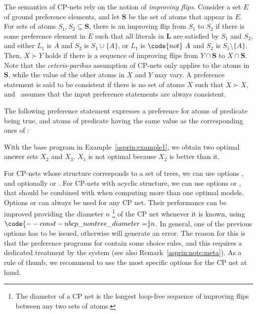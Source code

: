 The semantics of CP-nets rely on the notion of \emph{improving flips}.
%
Consider a set $E$ of ground preference elements,
and let $\boldsymbol{S}$ be the set of atoms that appear in $E$.
%
For sets of atoms $S_1, S_2 \subseteq \boldsymbol{S}$,
there is an improving flip from $S_1$ to $S_2$
if there is some preference element in $E$ such that
all literals in $\boldsymbol{L}$ are satisfied by $S_1$ and $S_2$, and
either $L_1$ is $A$ and $S_2$ is $S_1\cup\{A\}$, or
$L_1$ is $\code{not}~A$ and $S_2$ is $S_1\setminus\{A\}$.
%
Then, $X \succ Y$ holds if there is a sequence of improving flips
from $Y \cap \boldsymbol{S}$ to $X \cap \boldsymbol{S}$.
%
Note that the \emph{ceteris-paribus} assumption of CP-nets
only applies to the atoms in $\boldsymbol{S}$,
while the value of the other atoms in $X$ and $Y$ may vary.
%
A preference statement is said to be consistent
if there is no set of atoms $X$ such that $X \succ X$,
and \asprin\ assumes that the input  preference statements are always consistent.

\begin{example}
%
%
The following preference statement expresses a preference for atoms of predicate  being true,
and atoms of predicate  having the same value as the corresponding ones of :
%

%
With the base program in Example~\ref{asprin:example1},
we obtain two optimal answer sets $X_2$ and $X_3$.
%
$X_1$ is not optimal because $X_2$ is better than it.
\end{example} %

\begin{note}
For CP-nets whose structure corresponds to a set of trees,
we can use options , 
and optionally \code{--approximation=weak} or .
%
For CP-nets with acyclic structure,
we can use options  or , 
that should be combined with  when computing more than one optimal models.
%
Options \code{--meta=simple} or \code{--meta=combine} can always be used for any CP net. 
Their performance can be improved providing the diameter $n$%
\footnote{The diameter of a CP net is the longest loop-free sequence of improving flips
between any two sets of atoms.}
of the CP net whenever it is known,
using $\code{--const-nb cp\_nontree\_diameter=}n$.
%
In general, one of the previous options has to be issued,
otherwise  will generate an error.
%
The reason for this is that the preference programs for  contain some choice rules,
and this requires a dedicated treatment by the system (see also Remark~\ref{asprin:note:meta}).
%
As a rule of thumb,
we recommend to use the most specific options for the CP net at hand.
\end{note}


